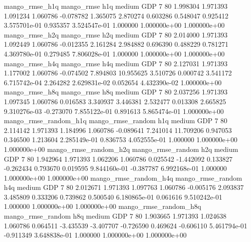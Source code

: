       mango_rmse_h1q        mango_rmse                  h1q     medium      GDP                 7 80  1.998304       1.971393 1.091234       1.060786   -0.078782      1.365075      2.870274     0.603286       0.548047  0.925412 3.575701e-01     0.935357   3.524547e-01            1.000000    1.000000e+00        1.000000e+00
       mango_rmse_h2q        mango_rmse                  h2q     medium      GDP                 7 80  2.014000       1.971393 1.092449       1.060786   -0.012355      2.161284      2.984882     0.696390       0.488229  0.781271 4.369780e-01     0.279485   7.806028e-01            1.000000    1.000000e+00        1.000000e+00
       mango_rmse_h4q        mango_rmse                  h4q     medium      GDP                 7 80  2.127031       1.971393 1.177002       1.060786   -0.074502      7.894803     10.955625     3.510726       0.000742  3.541172 6.715742e-04     2.264282   2.629831e-02            0.052654    4.432390e-02        1.000000e+00
       mango_rmse_h8q        mango_rmse                  h8q     medium      GDP                 7 80  2.037256       1.971393 1.097345       1.060786    0.016583      3.340937      3.446381     2.532477       0.013308  2.665825 9.310276e-03    -0.273070   7.855122e-01            0.891613    5.865474e-01        1.000000e+00
mango_rmse_random_h1q mango_rmse_random                  h1q     medium      GDP                 7 80  2.114142       1.971393 1.184996       1.060786   -0.089641      7.241014     11.709206     0.947053       0.346500  1.213604 2.285149e-01     0.836753   4.052555e-01            1.000000    1.000000e+00        1.000000e+00
mango_rmse_random_h2q mango_rmse_random                  h2q     medium      GDP                 7 80  1.942964       1.971393 1.062206       1.060786    0.025542     -1.442092      0.133827    -0.262434       0.793670  0.019595 9.844160e-01    -0.387787   6.992168e-01            1.000000    1.000000e+00        1.000000e+00
mango_rmse_random_h4q mango_rmse_random                  h4q     medium      GDP                 7 80  2.012671       1.971393 1.097763       1.060786   -0.005176      2.093837      3.485809     0.333206       0.739862  0.500540 6.180865e-01     0.061616   9.510242e-01            1.000000    1.000000e+00        1.000000e+00
mango_rmse_random_h8q mango_rmse_random                  h8q     medium      GDP                 7 80  1.903665       1.971393 1.024638       1.060786    0.064511     -3.435539     -3.407707    -0.726590       0.469624 -0.606110 5.461794e-01    -0.911349   3.648838e-01            1.000000    1.000000e+00        1.000000e+00
